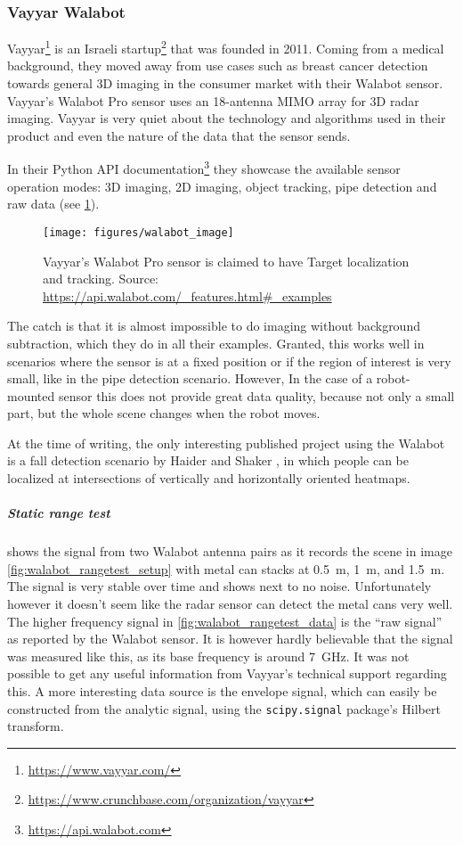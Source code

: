 \subsubsection{Vayyar Walabot}\label{walabot}

Vayyar\footnote{\url{https://www.vayyar.com/}} is an Israeli
startup\footnote{\url{https://www.crunchbase.com/organization/vayyar}} that was founded in 2011. Coming from a medical background, they moved away from use cases such as breast cancer detection towards general 3D imaging in the consumer market with their Walabot sensor. Vayyar's Walabot Pro sensor uses an 18-antenna MIMO array for 3D radar imaging. Vayyar is very quiet about the technology and algorithms used in their product and even the nature of the data that the sensor sends.

In their Python API documentation\footnote{\url{https://api.walabot.com}} they showcase the available sensor operation modes: 3D imaging, 2D imaging, object tracking, pipe detection and raw data (see \cref{fig:walabot_image}).

\begin{figure}[htbp]
    \centering
    \texttt{[image: figures/walabot\_image]}
    \caption{Vayyar's Walabot Pro sensor is claimed to have Target localization and tracking. Source: \url{https://api.walabot.com/\_features.html\#\_examples}}
    \label{fig:walabot_image}
\end{figure}

The catch is that it is almost impossible to do imaging without background subtraction, which they do in all their examples. Granted, this works well in scenarios where the sensor is at a fixed position or if the region of interest is very small, like in the pipe detection scenario. However, In the case of a robot-mounted sensor this does not provide great data quality, because not only a small part, but the whole scene changes when the robot moves.

At the time of writing, the only interesting published project using the Walabot is a fall detection scenario by Haider and Shaker \cite{Haider2017}, in which people can be localized at intersections of vertically and horizontally oriented heatmaps.

\subparagraph{Static range test}\label{static-range-test}

 shows the signal from two Walabot antenna pairs as it records the scene in image \cref{fig:walabot_rangetest_setup} with metal can stacks at \SI{0.5}{m}, \SI{1}{m}, and \SI{1.5}{m}. The signal is very stable over time and shows next to no noise. Unfortunately however it doesn't seem like the radar sensor can detect the metal cans very well. The higher frequency signal in \cref{fig:walabot_rangetest_data} is the ``raw signal'' as reported by the Walabot sensor. It is however hardly believable that the signal was measured like this, as its base frequency is around \SI{7}{GHz}. It was not possible to get any useful information from Vayyar's technical support regarding this. A more interesting data source is the envelope signal, which can easily be constructed from the analytic signal, using the \texttt{scipy.signal} package's Hilbert transform.


